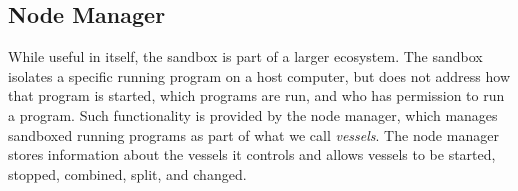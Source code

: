 %
%
%
%
%


\subsection{Node Manager}
\label{sec-nodemanager}
While useful in itself, the sandbox is part of a larger ecosystem.
The sandbox isolates a specific running program on a host computer,
but does not address how that program is started, which programs are
run, and who has permission to run a program. Such functionality is
provided by the node manager, which manages sandboxed running programs
as part of what we call \emph{vessels}. The node manager stores
information about the vessels it controls and allows vessels to be
started, stopped, combined, split, and changed.


